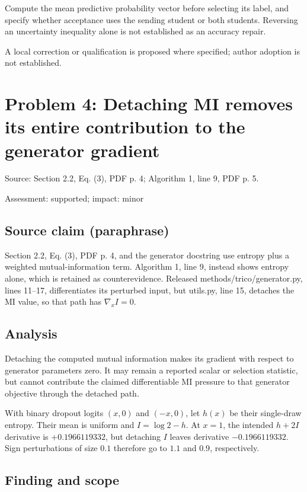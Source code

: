 \documentclass[11pt]{article}
\begin{document}
Compute the mean predictive probability vector before selecting its label, and specify whether acceptance uses the sending student or both students. Reversing an uncertainty inequality alone is not established as an accuracy repair.

A local correction or qualification is proposed where specified; author adoption is not established.

\section*{Problem 4: Detaching MI removes its entire contribution to the generator gradient}

Source: Section 2.2, Eq. (3), PDF p. 4; Algorithm 1, line 9, PDF p. 5.

Assessment: supported; impact: minor

\subsection*{Source claim (paraphrase)}

Section 2.2, Eq. (3), PDF p. 4, and the generator docstring use entropy plus a weighted mutual-information term. Algorithm 1, line 9, instead shows entropy alone, which is retained as counterevidence. Released methods/trico/generator.py, lines 11–17, differentiates its perturbed input, but utils.py, line 15, detaches the MI value, so that path has \(\nabla_x I=0\).

\subsection*{Analysis}

Detaching the computed mutual information makes its gradient with respect to generator parameters zero. It may remain a reported scalar or selection statistic, but cannot contribute the claimed differentiable MI pressure to that generator objective through the detached path.

With binary dropout logits \((x,0)\) and \((-x,0)\), let \(h(x)\) be their single-draw entropy. Their mean is uniform and \(I=\log2-h\). At \(x=1\), the intended \(h+2I\) derivative is \(+0.1966119332\), but detaching \(I\) leaves derivative \(-0.1966119332\). Sign perturbations of size \(0.1\) therefore go to \(1.1\) and \(0.9\), respectively.

\subsection*{Finding and scope}
\end{document}
